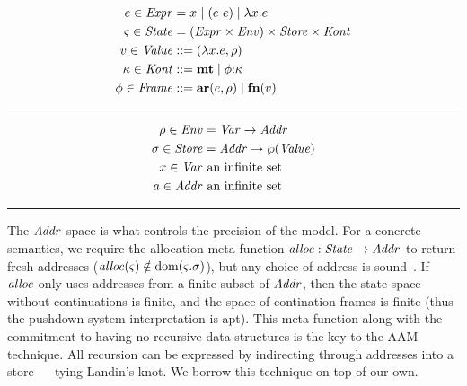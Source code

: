 \begin{minipage}[b]{.55\linewidth}
  \begin{align*}
  e \in \mathit{Expr} &= x^{{}} \mid (e\ e){} \mid \lambda{} x. e \\
  \varsigma \in \mathit{State} &= (\mathit{Expr} \times \mathit{Env}) \times \mathit{Store} \times \mathit{Kont} \\
  v \in \mathit{Value} &::= (\lambda{} x. e, \rho) \\
  \kappa \in \mathit{Kont} &::= \mathbf{mt} \mid \phi{\tt :} \kappa \\
  \phi \in \mathit{Frame} &::= \mathbf{ar}{}(e,\rho) \mid \mathbf{fn}{}(v)
  \end{align*}\hrule height 0pt\end{minipage}
\begin{minipage}[b]{.40\linewidth}
  \begin{align*}
  \rho \in \mathit{Env} &= \mathit{Var} \to \mathit{Addr} \\
  \sigma \in \mathit{Store} &= \mathit{Addr} \to \wp(\mathit{Value}) \\
  x \in \mathit{Var} &\text{ an infinite set} \\
  a \in \mathit{Addr} &\text{ an infinite set}
  \end{align*}\hrule height 0pt\end{minipage}

The $\mathit{Addr}$ space is what controls the precision of the model.
%
For a concrete semantics, we require the allocation meta-function $\mathit{alloc} :
\mathit{State} \to \mathit{Addr}$ to return fresh addresses ($\mathit{alloc}(\varsigma) \notin \text{dom}(\varsigma.\sigma)$), but any choice of address is sound~\citep{dvanhorn:Might2009Posteriori}.
%
If $\mathit{alloc}$ only uses addresses from a finite subset of $\mathit{Addr}$, then the state space without continuations is finite, and the space of contination frames is finite (thus the pushdown system interpretation is apt).
%
This meta-function along with the commitment to having no recursive data-structures is the key to the AAM technique.
%
All recursion can be expressed by indirecting through addresses into a store --- tying Landin's knot.
%
We borrow this technique on top of our own.

